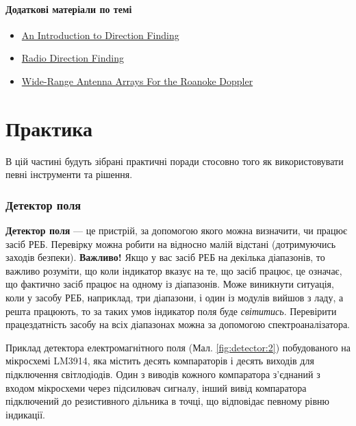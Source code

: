 \documentclass{article}
\begin{document}

\subsection{Додаткові матеріали по темі}
\begin{itemize}[noitemsep, topsep=8pt]
\item \href{https://www.youtube.com/watch?v=N8rZIAHxAH4}{An Introduction to Direction Finding}
\item \href{https://www.cryptomuseum.com/df/df.htm}{Radio Direction Finding}	
\item \href{http://www.homingin.com/newdopant.html}{Wide-Range Antenna Arrays For the Roanoke Doppler}
\end{itemize}


\newpage
\part{Практика}
В цій частині будуть зібрані практичні поради стосовно того як використовувати певні інструменти та рішення.

\section{Детектор поля}
\label{sec:radio:metter}

\textbf{Детектор поля} — це пристрій, за допомогою якого можна визначити, чи працює засіб РЕБ. Перевірку можна робити на відносно малій відстані (дотримуючись заходів безпеки). 
\textbf{Важливо!} Якщо у вас засіб РЕБ на декілька діапазонів, то важливо розуміти, що коли індикатор вказує на те, що засіб працює, це означає, що фактично засіб працює на одному із діапазонів. Може виникнути ситуація, коли у засобу РЕБ, наприклад, три діапазони, і один із модулів вийшов з ладу, а решта працюють, то за таких умов індикатор поля буде \textit{світитись}. Перевірити працездатність засобу на всіх діапазонах можна за допомогою спектроаналізатора.

Приклад детектора електромагнітного поля (Мал. \ref{fig:detector:2}) побудованого на мікросхемі LM3914, яка містить десять компараторів і десять виходів для підключення світлодіодів. Один з виводів кожного компаратора з'єднаний з входом мікросхеми через підсилювач сигналу, інший вивід компаратора підключений до резистивного дільника в точці, що відповідає певному рівню індикації.
\end{document}
